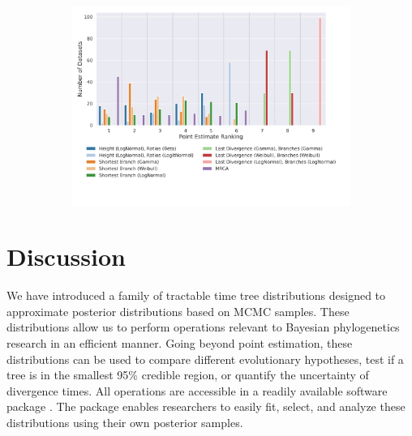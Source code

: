\documentclass[10pt,letterpaper]{article}
\begin{document}
\begin{figure}
	\begin{subfigure}[b]{0.45\textwidth}
		\centering
		\includegraphics[width=\textwidth]{figures/yule-400-ccd1-point-estimates-ranking.png}
	\end{subfigure}
	
	\label{fig:accuracy-point-estimators-ranking}
\end{figure}

\section*{Discussion}

We have introduced a family of tractable time tree distributions designed to approximate posterior distributions based on MCMC samples. These distributions allow us to perform operations relevant to Bayesian phylogenetics research in an efficient manner. Going beyond point estimation, these distributions can be used to compare different evolutionary hypotheses, test if a tree is in the smallest 95\% credible region, or quantify the uncertainty of divergence times. All operations are accessible in a readily available software package \cite{juliapackage}. The package enables researchers to easily fit, select, and analyze these distributions using their own posterior samples.
\end{document}
